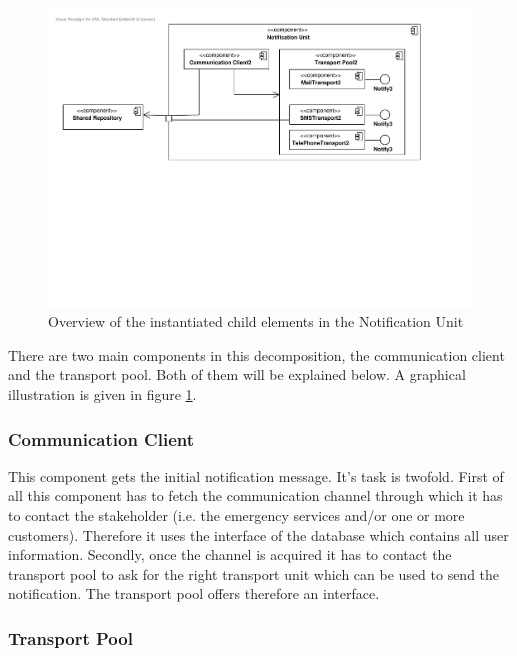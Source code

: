 \begin{figure}[H]
	\begin{centering}
		\includegraphics[width=\textwidth]{figs/add-it8-elements.pdf}
		\caption{Overview of the instantiated child elements in the Notification Unit}
		\label{fig:it8/elements}
	\end{centering}
\end{figure}

\npar There are two main components in this decomposition, the communication
client and the transport pool. Both of them will be explained below. A graphical
illustration is given in figure \ref{fig:it8/elements}.

\subsubsection{Communication Client} 
\npar This component gets the initial notification message. It's task is
twofold. First of all this component has to fetch the communication channel
through which it has to contact the stakeholder (i.e. the emergency services
and/or one or more customers). Therefore it uses the 
interface of the database which contains all user information. Secondly, once
the channel is acquired it has to contact the transport pool to ask for the
right transport unit which can be used to send the notification. The transport
pool offers therefore an  interface.

\subsubsection{Transport Pool}

